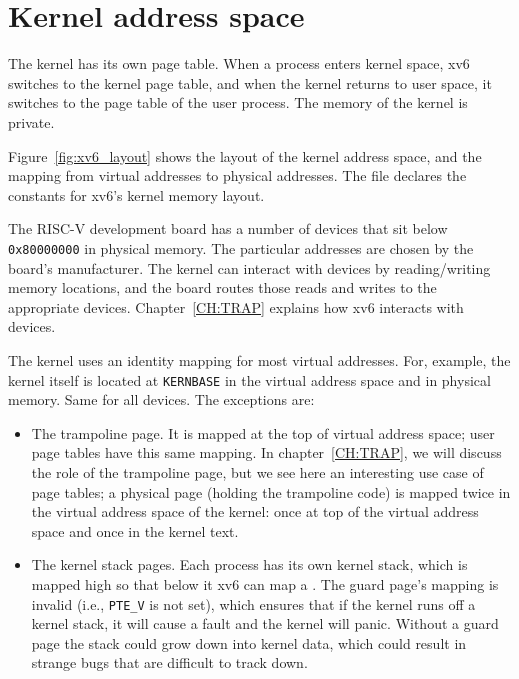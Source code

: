 \section{Kernel address space}
The kernel has its own page table.  When a process enters kernel
space, xv6 switches to the kernel page table, and when the kernel
returns to user space, it switches to the page table of the user
process.  The memory of the kernel is private.

Figure~\ref{fig:xv6_layout}
shows the layout of the kernel address space, and the mapping from
virtual addresses to physical addresses.  The file
declares the constants for xv6's kernel memory layout.

The RISC-V development board has a number of
devices that sit below
\texttt{0x80000000}
in physical memory. The particular addresses are chosen by the board's
manufacturer.  The kernel can interact with devices by reading/writing
memory locations, and the board routes those reads and writes to the
appropriate devices.  Chapter~\ref{CH:TRAP} explains
how xv6 interacts with devices.

The kernel uses an identity mapping for most virtual addresses.  For,
example, the kernel itself is located at
\lstinline{KERNBASE}
in the virtual address space and in physical memory.  Same for all
devices.   The exceptions are:

\begin{itemize}
  
\item The trampoline page. It is mapped at the top of virtual
  address space; user page tables have this same mapping.  In
  chapter~\ref{CH:TRAP}, we will discuss the role of the trampoline
  page, but we see here an interesting use case of page tables; a
  physical page (holding the trampoline code) is mapped twice in the
  virtual address space of the kernel: once at top of the virtual
  address space and once in the kernel text.

\item The kernel stack pages.  Each process has its own kernel stack,
  which is mapped high so that below it xv6 can map a .  The guard page's mapping is invalid (i.e.,
  \lstinline{PTE_V} is not set), which ensures that if the kernel runs
  off a kernel stack, it will cause a fault and the kernel will panic.
  Without a guard page the stack could grow down into kernel data,
  which could result in strange bugs that are difficult to track down.

\end{itemize}

